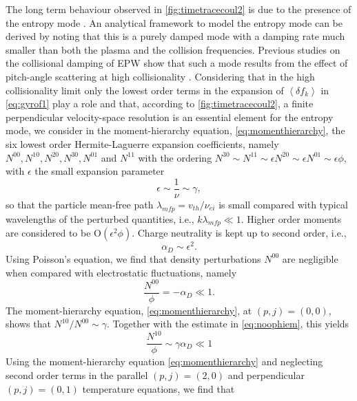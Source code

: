 The long term behaviour observed in \cref{fig:timetracecoul2} is due to the presence of the entropy mode \citep{Banks2016}.
%
An analytical framework to model the entropy mode can be derived by noting that this is a purely damped mode with a damping rate much smaller than both the plasma  and the collision frequencies.
%
Previous studies on the collisional damping of EPW show that such a mode results from the effect of pitch-angle scattering at high collisionality \citep{Banks2016}.
%
Considering that in the high collisionality limit only the lowest order terms in the expansion of $\left<\delta f_k\right>$ in \cref{eq:gyrof1} play a role and that, according to \cref{fig:timetracecoul2}, a finite perpendicular velocity-space resolution is an essential element for the entropy mode, we consider in the moment-hierarchy equation, \cref{eq:momenthierarchy}, the six lowest order Hermite-Laguerre expansion coefficients, namely $N^{00}, N^{10}, N^{20}, N^{30}, N^{01}$ and $N^{11}$ {with the ordering $N^{30}\sim N^{11} \sim \epsilon N^{20} \sim \epsilon N^{01}\sim\epsilon \phi$, with $\epsilon$ the small expansion parameter}
%
\begin{equation}
	\epsilon \sim \frac{1}{\nu} \sim \gamma,
	\label{eq:entordering1}
\end{equation}
%
{so that the particle mean-free path $\lambda_{mfp}=v_{th}/\nu_{ei}$ is small compared with typical wavelengths of the perturbed quantities, i.e., $k\lambda_{mfp}\ll 1$. Higher order moments are considered to be O$(\epsilon^2 \phi)$.}
%
{Charge neutrality is kept up to second order, i.e.,}
%
\begin{equation}
    \alpha_D \sim \epsilon^2.
\label{eq:hcdr}
\end{equation}
%
Using Poisson's equation, we find that density perturbations $N^{00}$ are negligible when compared with electrostatic fluctuations, namely
%
\begin{equation}
    \frac{N^{00}}{\phi} = -\alpha_D \ll 1.
\label{eq:noophiem}
\end{equation}
%
The moment-hierarchy equation, \cref{eq:momenthierarchy}, at $(p,j)=(0,0)$, shows that $N^{10}/N^{00} \sim \gamma$.
%
Together with the estimate in \cref{eq:noophiem}, this yields
%
\begin{equation}
    \frac{N^{10}}{\phi} \sim \gamma \alpha_D \ll 1
\label{eq:n10phiem}
\end{equation}
%
{Using the moment-hierarchy equation \cref{eq:momenthierarchy} and neglecting second order terms in the parallel $(p,j)=(2,0)$ and perpendicular $(p,j)=(0,1)$ temperature equations, we find that}
